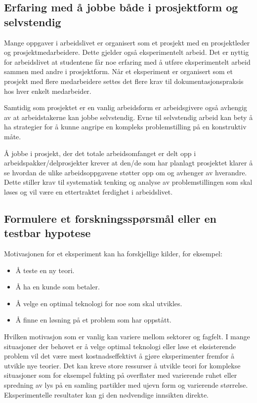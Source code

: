 \documentclass{article}
\begin{document}
\subsection{Erfaring med å jobbe både i prosjektform og selvstendig}
Mange oppgaver i arbeidslivet er organisert som et prosjekt med en prosjektleder og prosjektmedarbeidere.
Dette gjelder også eksperimentelt arbeid.
Det er nyttig for arbeidslivet at studentene får noe erfaring med å utføre eksperimentelt arbeid sammen med andre i prosjektform.
Når et eksperiment er organisert som et prosjekt med flere medarbeidere settes det flere krav til dokumentasjonspraksis hos hver enkelt medarbeider.

Samtidig som prosjektet er en vanlig arbeidsform er arbeidsgivere også avhengig av at arbeidstakerne kan jobbe selvstendig.
Evne til selvstendig arbeid kan bety å ha strategier for å kunne angripe en kompleks problemstilling på en konstruktiv måte.

Å jobbe i prosjekt, der det totale arbeidsomfanget er delt opp i arbeidspakker/delprosjekter krever at den/de som har planlagt prosjektet klarer å se hvordan de ulike arbeidsoppgavene støtter opp om og avhenger av hverandre.
Dette stiller krav til systematisk tenking og analyse av problemstillingen som skal løses og vil være en ettertraktet ferdighet i arbeidslivet.

\subsection{Formulere et forskningsspørsmål eller en testbar hypotese}
Motivasjonen for et eksperiment kan ha forskjellige kilder, for eksempel:
\begin{itemize}
  \item Å teste en ny teori.
  \item Å ha en kunde som betaler.
  \item Å velge en optimal teknologi for noe som skal utvikles.
  \item Å finne en løsning på et problem som har oppstått.
\end{itemize}

Hvilken motivasjon som er vanlig kan variere mellom sektorer og fagfelt.
I mange situasjoner der behovet er å velge optimal teknologi eller løse et eksisterende problem vil det være mest kostnadseffektivt å gjøre eksperimenter fremfor å utvikle nye teorier.
Det kan kreve store ressurser å utvikle teori for komplekse situasjoner som for eksempel fukting på overflater med varierende ruhet eller spredning av lys på en samling partikler med ujevn form og varierende størrelse.
Eksperimentelle resultater kan gi den nødvendige innsikten direkte.
\end{document}
